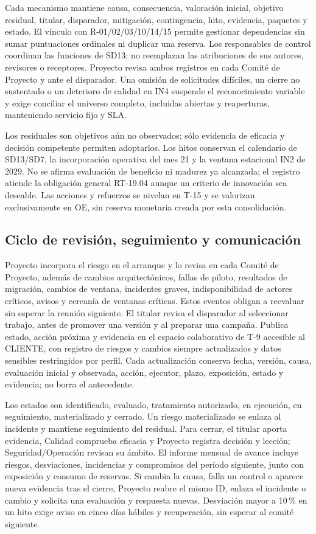 Cada mecanismo mantiene causa, consecuencia, valoración inicial, objetivo residual, titular, disparador, mitigación, contingencia, hito, evidencia, paquetes y estado. El vínculo con R-01/02/03/10/14/15 permite gestionar dependencias sin sumar puntuaciones ordinales ni duplicar una reserva. Los responsables de control coordinan las funciones de SD13; no reemplazan las atribuciones de sus autores, revisores o receptores. Proyecto revisa ambos registros en cada Comité de Proyecto y ante el disparador. Una omisión de solicitudes difíciles, un cierre no sustentado o un deterioro de calidad en IN4 suspende el reconocimiento variable y exige conciliar el universo completo, incluidas abiertas y reaperturas, manteniendo servicio fijo y SLA.

Los residuales son objetivos aún no observados; sólo evidencia de eficacia y decisión competente permiten adoptarlos. Los hitos conservan el calendario de SD13/SD7, la incorporación operativa del mes 21 y la ventana estacional IN2 de 2029. No se afirma evaluación de beneficio ni madurez ya alcanzada; el registro atiende la obligación general RT-19.04 aunque un criterio de innovación sea deseable. Las acciones y refuerzos se nivelan en T-15 y se valorizan exclusivamente en OE, sin reserva monetaria creada por esta consolidación. \parencite[RT-19.04, p.~33]{sd8-bt}

\subsection{Ciclo de revisión, seguimiento y comunicación}
Proyecto incorpora el riesgo en el arranque y lo revisa en cada Comité de Proyecto, además de cambios arquitectónicos, fallas de piloto, resultados de migración, cambios de ventana, incidentes graves, indisponibilidad de actores críticos, avisos y cercanía de ventanas críticas. Estos eventos obligan a reevaluar sin esperar la reunión siguiente. El titular revisa el disparador al seleccionar trabajo, antes de promover una versión y al preparar una campaña. Publica estado, acción próxima y evidencia en el espacio colaborativo de T-9 accesible al CLIENTE, con registro de riesgos y cambios siempre actualizados y datos sensibles restringidos por perfil. Cada actualización conserva fecha, versión, causa, evaluación inicial y observada, acción, ejecutor, plazo, exposición, estado y evidencia; no borra el antecedente.

Los estados son identificado, evaluado, tratamiento autorizado, en ejecución, en seguimiento, materializado y cerrado. Un riesgo materializado se enlaza al incidente y mantiene seguimiento del residual. Para cerrar, el titular aporta evidencia, Calidad comprueba eficacia y Proyecto registra decisión y lección; Seguridad/Operación revisan su ámbito. El informe mensual de avance incluye riesgos, desviaciones, incidencias y compromisos del período siguiente, junto con exposición y consumo de reservas. Si cambia la causa, falla un control o aparece nueva evidencia tras el cierre, Proyecto reabre el mismo ID, enlaza el incidente o cambio y solicita una evaluación y respuesta nuevas. Desviación mayor a 10\,\% en un hito exige aviso en cinco días hábiles y recuperación, sin esperar al comité siguiente. \parencite[RT-19.04--10, pp.~33--34]{sd8-bt}

